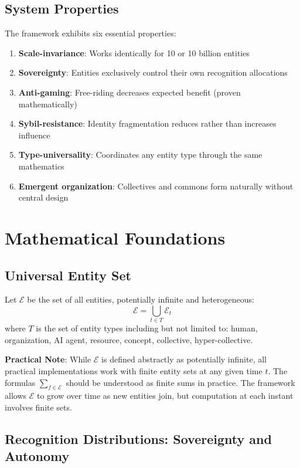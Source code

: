 \documentclass[11pt,a4paper]{article}
\theoremstyle{definition}
\theoremstyle{remark}
\newcommand{\E}{\mathcal{E}}
\begin{document}
\subsection{System Properties}

The framework exhibits six essential properties:

\begin{enumerate}
\item \textbf{Scale-invariance}: Works identically for 10 or 10 billion entities
\item \textbf{Sovereignty}: Entities exclusively control their own recognition allocations
\item \textbf{Anti-gaming}: Free-riding decreases expected benefit (proven mathematically)
\item \textbf{Sybil-resistance}: Identity fragmentation reduces rather than increases influence
\item \textbf{Type-universality}: Coordinates any entity type through the same mathematics
\item \textbf{Emergent organization}: Collectives and commons form naturally without central design
\end{enumerate}

\section{Mathematical Foundations}

\subsection{Universal Entity Set}

Let $\E$ be the set of all entities, potentially infinite and heterogeneous:
\[ \E = \bigcup_{t \in T} \E_t \]
where $T$ is the set of entity types including but not limited to: human, organization, AI agent, resource, concept, collective, hyper-collective.

\textbf{Practical Note}: While $\E$ is defined abstractly as potentially infinite, all practical implementations work with finite entity sets at any given time $t$. The formulas $\sum_{f \in \E}$ should be understood as finite sums in practice. The framework allows $\E$ to grow over time as new entities join, but computation at each instant involves finite sets.

\subsection{Recognition Distributions: Sovereignty and Autonomy}
\end{document}
